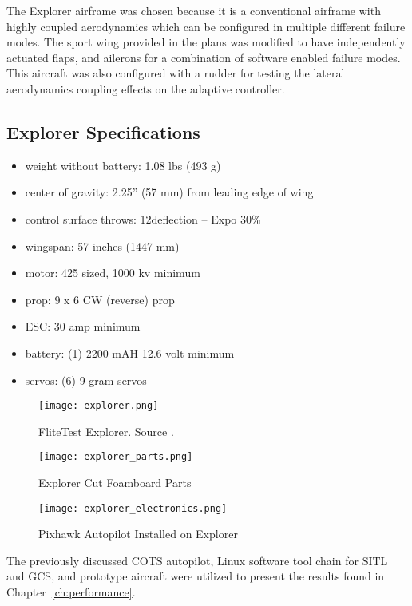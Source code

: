 The Explorer airframe was chosen because it is a conventional airframe with highly coupled aerodynamics which can be configured in multiple different failure modes.  The sport wing provided in the plans was modified to have independently actuated flaps, and ailerons for a combination of software enabled failure modes.  This aircraft was also configured with a rudder for testing the lateral aerodynamics coupling effects on the adaptive controller.  

\subsection{Explorer Specifications}
\begin{itemize}
 \item weight without battery: 1.08 lbs (493 g)
 \item center of gravity: 2.25” (57 mm) from leading edge of wing
 \item control surface throws: 12\degrees  deflection – Expo 30\%
 \item wingspan: 57 inches (1447 mm)
 \item motor: 425 sized, 1000 kv minimum
 \item prop: 9 x 6 CW (reverse) prop
 \item ESC: 30 amp minimum
 \item battery: (1) 2200 mAH 12.6 volt minimum
 \item servos: (6) 9 gram servos 
\end{itemize}

\begin{figure}[!h]
 \centering
  \texttt{[image: explorer.png]}
  \caption{FliteTest Explorer.  Source \cite{flitetest}.}
  \label{fig:explorer_parts}
\end{figure}

\begin{figure}[!h]
 \centering
  \texttt{[image: explorer\_parts.png]}
  \caption{Explorer Cut Foamboard Parts}
  \label{fig:explorer_parts}
\end{figure}

\begin{figure}[!h]
 \centering
  \texttt{[image: explorer\_electronics.png]}
  \caption{Pixhawk Autopilot Installed on Explorer}
  \label{fig:explorer_electronics}
\end{figure}

The previously discussed \ac{COTS} autopilot, Linux software tool chain for \ac{SITL} and \ac{GCS}, and prototype aircraft were utilized to present the results found in Chapter~\ref{ch:performance}.




